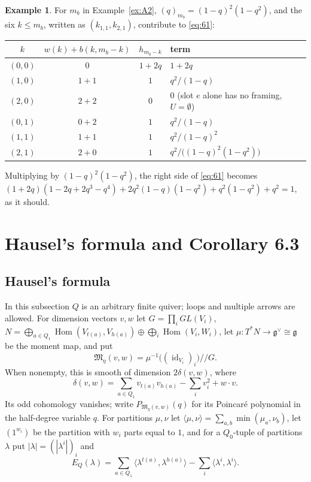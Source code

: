 \documentclass[11pt]{amsart}
\theoremstyle{definition}
\newtheorem{example}[theorem]{Example}
\theoremstyle{remark}
\numberwithin{equation}{section}
\DeclareMathOperator{\id}{id}
\begin{document}
\begin{example}
For $m_b$ in Example~\ref{ex:A2}, $(q)_{m_b}=(1-q)^2(1-q^2)$, and the six $k\le m_b$, written as
$(k_{1,1},k_{2,1})$, contribute to \eqref{eq:61}:
\begin{center}
\renewcommand{\arraystretch}{1.25}
\begin{tabular}{cccl}
\hline
$k$ & $w(k)+b(k,m_b-k)$ & $h_{m_b-k}$ & term\\
\hline
$(0,0)$ & $0$ & $1+2q$ & $1+2q$\\
$(1,0)$ & $1+1$ & $1$ & $q^2/(1-q)$\\
$(2,0)$ & $2+2$ & $0$ & $0$ \quad (slot $e$ alone has no framing, $U=\emptyset$)\\
$(0,1)$ & $0+2$ & $1$ & $q^2/(1-q)$\\
$(1,1)$ & $1+1$ & $1$ & $q^2/(1-q)^2$\\
$(2,1)$ & $2+0$ & $1$ & $q^2/\big((1-q)^2(1-q^2)\big)$\\
\hline
\end{tabular}
\end{center}
Multiplying by $(1-q)^2(1-q^2)$, the right side of \eqref{eq:61} becomes
$(1+2q)(1-2q+2q^3-q^4)+2q^2(1-q)(1-q^2)+q^2(1-q^2)+q^2=1$, as it should.
\end{example}

\section{Hausel's formula and Corollary 6.3}\label{sec:hausel}

\subsection{Hausel's formula}
In this subsection $Q$ is an arbitrary finite quiver; loops and multiple arrows are allowed. For
dimension vectors $v,w$ let $G=\prod_iGL(V_i)$,
$N=\bigoplus_{a\in Q_1}\operatorname{Hom}(V_{t(a)},V_{h(a)})\oplus\bigoplus_i\operatorname{Hom}(V_i,W_i)$,
let $\mu:T^*N\to\mathfrak g^\vee\cong\mathfrak g$ be the moment map, and put
\[
  \mathfrak M_\eta(v,w)=\mu^{-1}\big((\id_{V_i})_i\big)/\!/G .
\]
When nonempty, this is smooth of dimension $2\delta(v,w)$, where
\[
  \delta(v,w)=\sum_{a\in Q_1}v_{t(a)}v_{h(a)}-\sum_iv_i^2+w\cdot v .
\]
Its odd cohomology vanishes; write $P_{\mathfrak M_\eta(v,w)}(q)$ for its Poincar\'e polynomial in the
half-degree variable $q$. For partitions $\mu,\nu$ let $\langle\mu,\nu\rangle=\sum_{a,b}\min(\mu_a,\nu_b)$,
let $(1^{w_i})$ be the partition with $w_i$ parts equal to $1$, and for a $Q_0$-tuple of partitions
$\lambda$ put $|\lambda|=(|\lambda^i|)_i$ and
\[
  E_Q(\lambda)=\sum_{a\in Q_1}\langle\lambda^{t(a)},\lambda^{h(a)}\rangle-\sum_i\langle\lambda^i,\lambda^i\rangle .
\]
\end{document}
